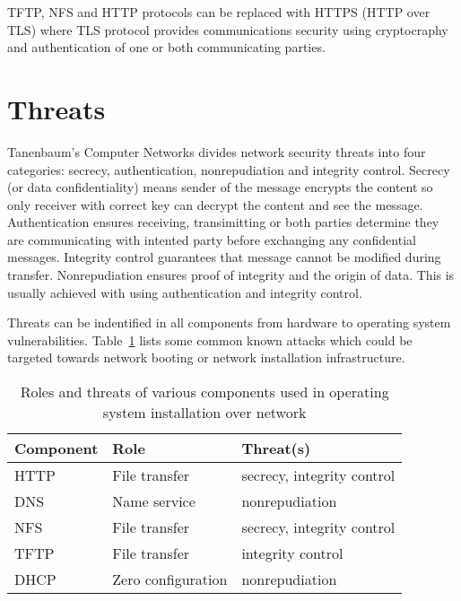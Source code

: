 TFTP, NFS and HTTP protocols can be replaced with HTTPS (HTTP over
TLS) where TLS protocol provides communications security using
cryptocraphy and authentication of one or both communicating parties.


\section{Threats}

Tanenbaum's Computer Networks\cite{Tanenbaum} divides network security
threats into four categories: secrecy, authentication, nonrepudiation
and integrity control. Secrecy (or data confidentiality) means sender
of the message encrypts the content so only receiver with correct key
can decrypt the content and see the message. Authentication ensures
receiving, transimitting or both parties determine they are
communicating with intented party before exchanging any confidential
messages. Integrity control guarantees that message cannot be modified
during transfer. Nonrepudiation ensures proof of integrity and the
origin of data. This is usually achieved with using authentication and
integrity control.

Threats can be indentified in all components from hardware to
operating system vulnerabilities. Table~\ref{tab:threats_table} lists
some common known attacks which could be targeted towards network
booting or network installation infrastructure.

\begin{table}[!ht]
  \def\arraystretch{1.1}%
  \begin{center}
    \label{tab:threats_table}
    \begin{tabular}{| l | l | l |}
      \hline
      Component   & Role               & Threat(s)                  \\
      \hline
      HTTP        & File transfer      & secrecy, integrity control \\
      DNS         & Name service       & nonrepudiation             \\
      NFS         & File transfer      & secrecy, integrity control \\
      TFTP        & File transfer      & integrity control          \\
      DHCP        & Zero configuration & nonrepudiation             \\
      \hline
    \end{tabular}
    \caption{Roles and threats of various components used in operating
      system installation over network}
  \end{center}
\end{table}

